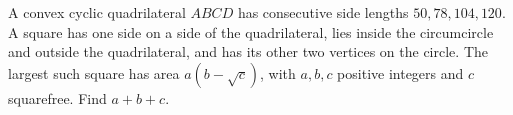 A convex cyclic quadrilateral $ABCD$ has consecutive side lengths $50,78,104,120$. A square has one side on a side of the quadrilateral, lies inside the circumcircle and outside the quadrilateral, and has its other two vertices on the circle. The largest such square has area $a(b-\sqrt c)$, with $a,b,c$ positive integers and $c$ squarefree. Find $a+b+c$.
